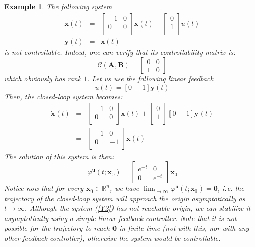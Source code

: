 \documentclass[a4paper,10pt,oneside]{book}
\newtheorem{example}{Example}
\begin{document}
\begin{example}
 The following system
\begin{eqnarray}
\dot{\mathbf{x}}(t)&=&\left[ {\begin{array}{cc}
 -1 & 0  \\
 0 & 0  \\
 \end{array} } \right]
\mathbf{x}(t)+ 
\left[ {\begin{array}{c}
 0  \\
 1  \\
 \end{array} } \right]
u(t)\label{Y2}\\
\mathbf{y}(t)&=&\mathbf{x}(t)
\end{eqnarray}
is not controllable. Indeed, one can verify that its controllability matrix is:
\begin{equation}
 \mathcal{C}(\mathbf{A},\mathbf{B})=\left[ {\begin{array}{cc}0&0\\1&0 \end{array} }\right]
\end{equation}
which obviously has rank $1$. Let us use the following linear feedback
\begin{equation}
 u(t)=[0\ -1]\mathbf{y}(t)
\end{equation}
Then, the closed-loop system becomes:
\begin{eqnarray}
\dot{\mathbf{x}}(t)&=&\left[ {\begin{array}{cc}
 -1 & 0  \\
 0 & 0  \\
 \end{array} } \right]
\mathbf{x}(t)+
\left[ {\begin{array}{c}
 0  \\
 1  \\
 \end{array} } \right][0\ -1] 
\mathbf{y}(t)\\&=&\left[ {\begin{array}{cc}
 -1 & 0  \\
 0 & -1  \\
 \end{array} } \right]
\mathbf{x}(t)
\end{eqnarray}
The solution of this system is then:
\begin{equation}
 \varphi^{\mathbf{u}}(t;\mathbf{x}_0)=\left[ {\begin{array}{cc}e^{-t}&0\\0&e^{-t}\end{array} } \right]\mathbf{x}_0
\end{equation}
Notice now that for every $\mathbf{x}_0\in\mathbb{R}^n$, we have $\lim_{t\to\infty}\varphi^{\mathbf{u}}(t;\mathbf{x}_0)=\mathbf{0}$, i.e. the trajectory of the closed-loop system will approach the origin asymptotically as $t\to\infty$. Although the system (\ref{Y2}) has not reachable origin, we can stabilize it \emph{asymptotically} using a simple linear feedback controller. Note that it is not possible for the trajectory to reach $\mathbf{0}$ in finite time (not with this, nor with any other feedback controller), otherwise the system would be controllable.
\end{example}
\end{document}
